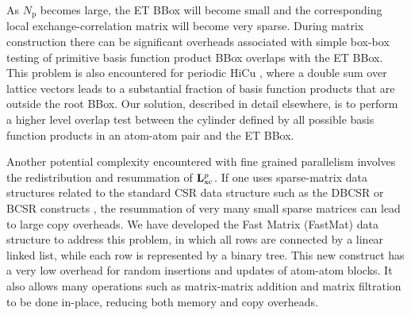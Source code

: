 \commentoutA{\documentclass[prb,aps,twocolumn,twocolumngrid]{revtex4}}
\newcommand{\Np}{N_{\mathrm{p}}} \newcommand{\Nbox}{N_{\mathrm{b}}}
\begin{document}

As  $\Np$ becomes large, the ET BBox will become small and the corresponding local 
exchange-correlation matrix will become very sparse.  During matrix construction there 
can be significant overheads associated with simple box-box testing of primitive basis function product
BBox overlaps with the ET BBox.  This problem is also encountered for periodic HiCu \cite{CTymczak02},
where a double sum over lattice vectors leads to a substantial fraction of basis function products 
that are outside the root BBox.  Our solution, described in detail elsewhere, is to perform a
higher level overlap test between the cylinder defined by all possible basis function products 
in an atom-atom pair and the ET BBox.  

Another potential complexity encountered with fine grained parallelism involves the redistribution 
and resummation of ${\bf L}_{\mathrm{xc}}^{p}$.  If one uses sparse-matrix data structures related to 
the standard CSR \cite{FGustavson78,SPissanetzky84} data structure such as the DBCSR or BCSR 
constructs \cite{MChallacombe00B}, the resummation of very many small sparse matrices can lead to large 
copy overheads.   We have developed  the Fast Matrix (FastMat) data structure
to address this problem,  in which all rows are connected by a linear linked list, while each row is 
represented by a binary tree.  This new construct has a very low overhead for random insertions and 
updates of atom-atom blocks.  It also allows many operations such as matrix-matrix addition and
matrix filtration to be done in-place, reducing both memory and copy overheads.
\end{document}
